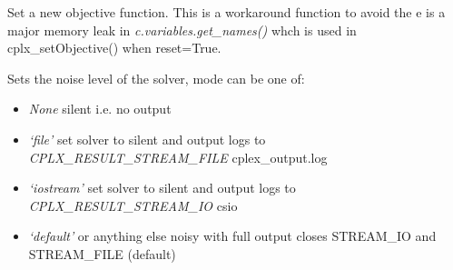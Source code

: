 \documentclass[a4paper,11pt,english]{sphinxmanual}
\begin{document}

\begin{fulllineitems}
\label{modules_doc:cbmpy.CBCPLEX.cplx_setObjective2}
Set a new objective function. This is a workaround function to avoid the
e is a major memory leak in \emph{c.variables.get\_names()} whch is used
in cplx\_setObjective()  when reset=True.

\end{fulllineitems}


\begin{fulllineitems}
\label{modules_doc:cbmpy.CBCPLEX.cplx_setOutputStreams}
Sets the noise level of the solver, mode can be one of:
\begin{itemize}
\item {} 
\emph{None} silent i.e. no output

\item {} 
\emph{`file'} set solver to silent and output logs to \emph{CPLX\_RESULT\_STREAM\_FILE} cplex\_output.log

\item {} 
\emph{`iostream'} set solver to silent and output logs to \emph{CPLX\_RESULT\_STREAM\_IO} csio

\item {} 
\emph{`default'} or anything else noisy with full output closes STREAM\_IO and STREAM\_FILE (default)

\end{itemize}

\end{fulllineitems}

\end{document}
